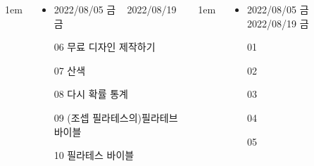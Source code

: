\documentclass[	20pt, 
							a1paper, 
							portrait, %
							margin=0mm, %
							innermargin=10mm,  		%
							colspace=5mm, 
							subcolspace=0mm
							]{tikzposter}
\begin{document}
\begin{columns}
			{
					\setlength{\leftmargini}{3em}
					\setlength{\labelsep} {1em}
				\begin{LARGE}
					\begin{itemize}
					\item 	2022/08/05 금 ~ 2022/08/19 금
					\item 	[06]  무료 디자인 제작하기
					\item 	[07]  산색
					\item 	[08]  다시  확률 통계
					\item 	[09]  (조셉 필라테스의)필라테브 바이블
					\item 	[10] 필라테스 바이블  
					\end{itemize}
				\end{LARGE}
			}







			{
					\setlength{\leftmargini}{3em}
					\setlength{\labelsep} {1em}
				\begin{LARGE}
					\begin{itemize}
					\item 	2022/08/05 금 ~ 2022/08/19 금
					\item 	[01] 
					\item 	[02] 
					\item 	[03]  
					\item 	[04]  
					\item 	[05]  
					\end{itemize}
				\end{LARGE}
			}





	\end{columns}
\end{document}
